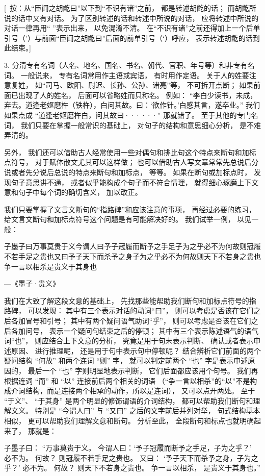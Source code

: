 [\ 按：从“臣闻之胡齕曰”以下到“不识有诸”之前，
都是转述胡齕的话；
而胡齕所说的话中又有对话。
为了区别转述的话和转述中所说的对话，
应将转述中所说的对话一律再用“ ”表示出来，
以免混淆不清。
在“不识有诸”之前还得加上一个后单引号（’）与前面“臣闻之胡齕曰”后面的前单引号（‘）呼应，
表示转述胡齕的话到此结束。]

3. 分清专有名词（人名、地名、国名、书名、朝代、官职、年号等）和非专有名词。
一般说来，
专有名词常用作主语或宾语，
有时用作定语。
关于人的姓要注意复姓，
如“司马、欧阳、尉迟、长孙、公孙、诸亮”等，
不可拆开点断；
如果前面已出现了人的姓名，
后面可以省略姓而只称名。
例如：
“李白少读书，未成，弃去。道逢老妪磨杵（铁杵），白问其故。曰：‘欲作针。’白感其言，遂卒业。”
我们如果点成
“道逢老妪磨杵白，问其故曰······”
那就错了。
至于其他的专门名词，
我们只要在掌握一般常识的基础上，
对句子的结构和意思细心分析，
是不难弄清的。

另外，
我们还可以借助古人经常使用一些对偶句和排比句这个特点来断句和加标点符号，
对于赋体散文尤其可以这样做；
也可以借助古人写文章常常先总说后分说或者先分说后总说的特点来断句和加标点，
等等。
如果在断句或加标点时，
发现句子意思讲不通，
或者似乎能构成个句子而不符合情理，
就得细心琢磨上下文意和句子中每个词的确切含义，
加以改正。

我们只要掌握了文言文断句的“指路碑”和应该注意的事项，
再经过必要的练习，
给文言文断句和加标点符号这个问题是有可能解决好的。
我们试举一例，
以见一般：

子墨子曰万事莫贵于义今谓人曰予子冠履而断予之手足子为之乎必不为何故则冠履不若手足之贵也又曰予子天下而杀予之身子为之乎必不为何故则天下不若身之贵也争一言以相杀是贵义于其身也
\begin{flushright}
    ---《墨子·贵义》
\end{flushright}

我们在大致了解这段文意的基础上，
先找那些能帮助我们断句和加标点符号的指路碑，
可以发现：
其中有三个表示对话的动词“曰”，
则可以考虑是否该在它们之后各加冒号和引号；
其中有两个疑问语气助词“乎”，
则可以考虑是否该在它们之后各加问号，
表示一个疑问句结束之后的停顿；
其中有三个表示陈述语气的语气词“也”，
则应结合上下文意的分析，
究竟是用于句末表示判断、
确认或者表示申述原因、
进行推理呢，
还是用于句中表示句中停顿呢？
结合辨析它们前面的两个疑问结构
“何故”
和两个连词
“则”
字，
就可以判定前两个
“也”
字是表示申述原因的，
最后一个
“也”
字则明显地表示判断，
它们后面都应该用个句号。
我们再根据连词
“而”
和
“以”
连接前后两个相关的词语
（“争一言以相杀”的“以”不是构成介词结构，而是连接两个相承的动作，所以是连词），
又可以点开两处。
至于
“于义”、
“于其身”
是两个明显的修饰谓语的介词结构，
都可以帮助我们断句和理解文义。
特别是
“今谓人曰”
与
“又曰”
之后的文字前后并列对举，
句式结构基本相似，
更可以帮助我们理解文意和断句。
分析至此，
全段断句和标点也就明确起来了，
那就是：

子墨子曰：
“万事莫贵于义。
今谓人曰：‘予子冠履而断予之手足，子为之乎？’
必不为。
何故？
则冠履不若手足之贵也。
又曰：
‘予子天下而杀予之身，子为之乎？’
必不为。
何故？
则天下不若身之贵也。
争一言以相杀，
是贵义于其身也。”
\newpage